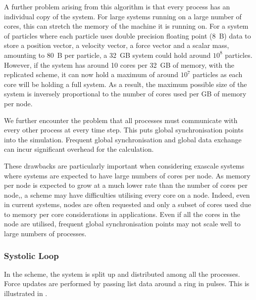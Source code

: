 A further problem arising from this algorithm is that every process has
an individual copy of the system.
%
For large systems running on a large number of cores,
this can stretch the memory of the machine it is running on.
%
For a system of particles where each particle uses double
precision floating point (8~B) data to store
a position vector,
a velocity vector,
a force vector and
a scalar mass,
amounting to 80~B per particle, a 32~GB system could hold around $10^8$
particles.
%
However, if the system has around 10 cores per 32~GB of memory,
with the replicated scheme,
it can now hold a maximum of around $10^7$ particles
as each core will be holding a full system.
%
As a result, the maximum possible size of the system is
inversely proportional to
the number of cores used per GB of memory per node.

We further encounter the problem that all processes must communicate
with every other process at every time step.
%
This puts global synchronisation points into the simulation.
%
Frequent global synchronisation and global data exchange can incur
significant overhead for the calculation.

%
These drawbacks are particularly important when considering exascale systems
where systems are expected to have large numbers of cores per node.
%
As memory per node is expected to grow at a much lower rate than
the number of cores per node,,
a \replicateddata{} scheme may have difficulties utilising every core on a node.
%
Indeed, even in current systems, nodes are often requested and only a
subset of cores used due to memory per core considerations in applications.
%
Even if all the cores in the node are utilised, frequent global synchronisation
points may not scale well to large numbers of processes.



\subsubsection{Systolic Loop}
\label{sec:background:subsec:systolic_loop}

%
In the \systolicloop{} scheme, the system is split up and distributed among
all the processes.
%
Force updates are performed by passing list data around a ring in pulses.
%
This is illustrated in .

